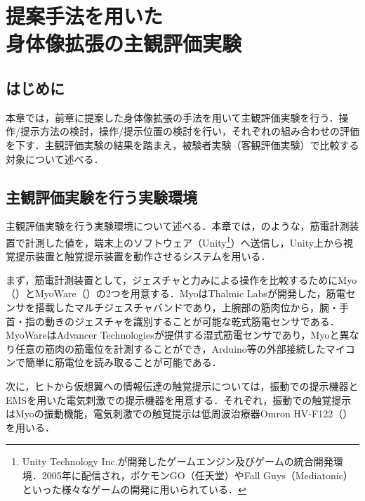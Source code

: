 \chapter[提案手法を用いた身体像拡張の主観評価実験]%
        {提案手法を用いた\\身体像拡張の主観評価実験}

\section{はじめに}
    本章では，前章に提案した身体像拡張の手法を用いて主観評価実験を行う．操作/提示方法の検討，操作/提示位置の検討を行い，それぞれの組み合わせの評価を下す．主観評価実験の結果を踏まえ，被験者実験（客観評価実験）で比較する対象について述べる．

\section{主観評価実験を行う実験環境}

    主観評価実験を行う実験環境について述べる．本章では，のような，筋電計測装置で計測した値を，端末上のソフトウェア（Unity\footnote{Unity Technology Inc.が開発したゲームエンジン及びゲームの統合開発環境．2005年に配信され，ポケモンGO（任天堂）やFall Guys（Mediatonic）といった様々なゲームの開発に用いられている．}）へ送信し，Unity上から視覚提示装置と触覚提示装置を動作させるシステムを用いる．

    まず，筋電計測装置として，ジェスチャと力みによる操作を比較するためにMyo（）\cite{thalmiclabs}とMyoWare（）\cite{advancertechnologies}の2つを用意する．MyoはThalmic Labsが開発した，筋電センサを搭載したマルチジェスチャバンドであり，上腕部の筋肉位から，腕・手首・指の動きのジェスチャを識別することが可能な乾式筋電センサである．MyoWareはAdvancer Technologiesが提供する湿式筋電センサであり，Myoと異なり任意の筋肉の筋電位を計測することができ，Arduino等の外部接続したマイコンで簡単に筋電位を読み取ることが可能である．

    次に，ヒトから仮想翼への情報伝達の触覚提示については，振動での提示機器とEMSを用いた電気刺激での提示機器を用意する．それぞれ，振動での触覚提示はMyoの振動機能，電気刺激での触覚提示は低周波治療器Omron HV-F122（）\cite{Omron-HV-F122}を用いる．

